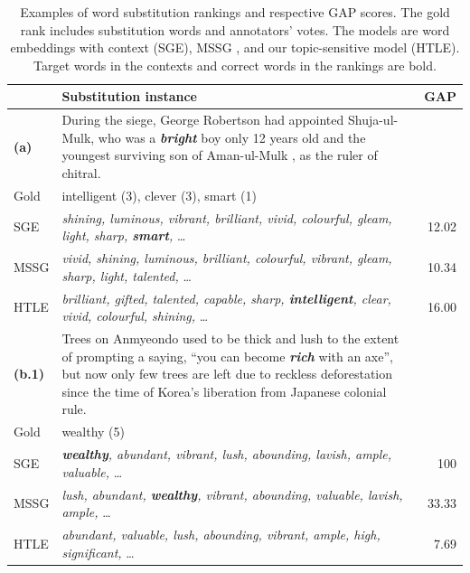 \begin{table}  \setlength{\tabcolsep}{0.5em}
\begin{center}
\small
\caption{\label{lsexample} Examples of word substitution rankings and respective GAP scores. The gold rank includes substitution words and annotators' votes. The models are word embeddings with context (SGE), MSSG \citep{neelakantan2014efficient}, and our topic-sensitive model (HTLE). Target words in the contexts and correct words in the rankings are bold.}
\begin{tabularx}{\textwidth}{lXr}
\toprule
& \textbf{Substitution instance} & \textbf{GAP} \\
\midrule
   \textbf{ (a)}  & {During the siege, George Robertson had appointed Shuja-ul-Mulk, who was a \textit{\textbf{bright}} boy only 12 years old and the youngest surviving son of Aman-ul-Mulk , as the ruler of chitral.} &   \\
 \hdashline
\rule{0pt}{2.5ex} 
   Gold & intelligent (3), clever (3), smart (1) & \\
 \hdashline
\rule{0pt}{2.5ex} 
   SGE   & \textit{shining, luminous, vibrant, brilliant, vivid, colourful, gleam, light, sharp, \textbf{smart},} \ldots & 12.02 \\ %
  MSSG  & \textit{vivid, shining, luminous, brilliant, colourful, vibrant, gleam, sharp, light, talented,} \ldots & 10.34 \\
   HTLE   & \textit{brilliant, gifted, talented, capable, sharp, \textbf{intelligent}, clear, vivid, colourful, shining,} \ldots & 16.00 \\ 
 \midrule
    \textbf{(b.1)}  & Trees on Anmyeondo used to be thick and lush to the extent of prompting a saying, ``you can become \textit{\textbf{rich}} with an axe'', but now only few trees are left due to reckless deforestation since the time of Korea's liberation from Japanese colonial rule.  &  \\
  \hdashline
\rule{0pt}{2.5ex} 
   Gold   & wealthy (5) &  \\
  \hdashline
\rule{0pt}{2.5ex} 
   SGE   & \textit{\textbf{wealthy}, abundant, vibrant, lush, abounding, lavish, ample, valuable,} \ldots & 100 \\
   MSSG  &\textit{ lush, abundant, \textbf{wealthy}, vibrant, abounding, valuable, lavish, ample,} \ldots & 33.33 \\
   HTLE   & \textit{abundant, valuable, lush, abounding, vibrant, ample, high, significant,} \ldots & 7.69 \\ 

\end{tabularx}
\end{center}
\end{table}
